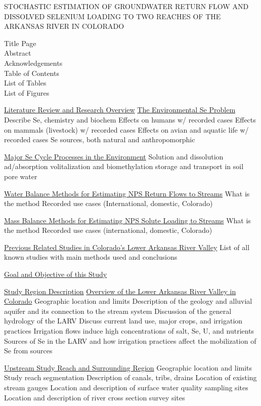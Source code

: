 \documentclass[12pt]{article}
\begin{document}
\begin{center}
STOCHASTIC ESTIMATION OF GROUNDWATER RETURN FLOW AND DISSOLVED SELENIUM LOADING TO TWO REACHES OF THE ARKANSAS RIVER IN COLORADO
\end{center}
Title Page\\
Abstract\\
Acknowledgements\\
Table of Contents\\
List of Tables\\
List of Figures\\
\begin{outline}[enumerate]
	\1 \underline{Literature Review and Research Overview}
		\2 \underline{The Environmental Se Problem}
			\3 Describe Se, chemistry and biochem
			\3 Effects on humans w/ recorded cases
			\3 Effects on mammals (livestock) w/ recorded cases
			\3 Effects on avian and aquatic life w/ recorded cases
			\3 Se sources, both natural and anthropomorphic
			
		\2 \underline{Major Se Cycle Processes in the Environment}
			\3 Solution and dissolution
			\3 ad/absorption
			\3 volitalization and biomethylation
			\3 storage and transport in soil pore water

		\2 \underline{Water Balance Methods for Estimating NPS Return Flows to Streams}
			\3 What is the method
			\3 Recorded use cases (International, domestic, Colorado)

		\2 \underline{Mass Balance Methods for Estimating NPS Solute Loading to Streams}
			\3 What is the method
			\3 Recorded use cases (international, domestic, Colorado)

		\2 \underline{Previous Related Studies in Colorado's Lower Arkansas River Valley}
			\3 List of all known studies with main methods used and  conclusions
			
		\2 \underline{Goal and Objective of this Study}

	\1 \underline{Study Region Description}
		\2 \underline{Overview of the Lower Arkansas River Valley in Colorado}
			\3 Geographic location and limits
			\3 Description of the geology and alluvial aquifer and its connection to the stream system
			\3 Discussion of the general hydrology of the LARV
			\3 Discuss current land use, major crops, and irrigation practices
			\3 Irrigation flows induce high concentrations of salt, Se, U, and nutrients
			\3 Sources of Se in the LARV and how irrigation practices affect the mobilization of Se from sources

		\2 \underline{Upstream Study Reach and Surrounding Region}
			\3 Geographic location and limits
			\3 Study reach segmentation
			\3 Description of canals, tribs, drains
			\3 Location of existing stream gauges
			\3 Location and description of surface water quality sampling sites
			\3 Location and description of river cross section survey sites


\end{outline}
\end{document}
